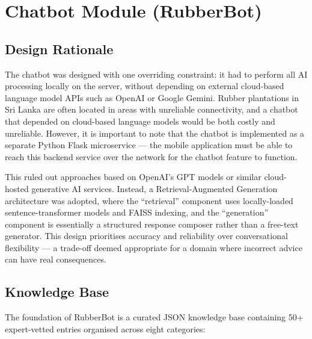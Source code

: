 \section{Chatbot Module (RubberBot)}

\subsection{Design Rationale}

The chatbot was designed with one overriding constraint: it had to perform all AI processing locally on the server, without depending on external cloud-based language model APIs such as OpenAI or Google Gemini. Rubber plantations in Sri Lanka are often located in areas with unreliable connectivity, and a chatbot that depended on cloud-based language models would be both costly and unreliable. However, it is important to note that the chatbot is implemented as a separate Python Flask microservice --- the mobile application must be able to reach this backend service over the network for the chatbot feature to function.

This ruled out approaches based on OpenAI's GPT models or similar cloud-hosted generative AI services. Instead, a Retrieval-Augmented Generation architecture was adopted, where the ``retrieval'' component uses locally-loaded sentence-transformer models and FAISS indexing, and the ``generation'' component is essentially a structured response composer rather than a free-text generator. This design prioritises accuracy and reliability over conversational flexibility --- a trade-off deemed appropriate for a domain where incorrect advice can have real consequences.

\subsection{Knowledge Base}

The foundation of RubberBot is a curated JSON knowledge base containing 50+ expert-vetted entries organised across eight categories:

